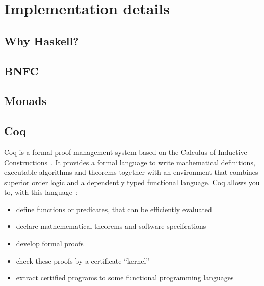 \chapter{Implementation details}

\section{Why Haskell?}

\section{BNFC}

\section{Monads}

\section{Coq} 
Coq is a formal proof management system based on the Calculus of Inductive
Constructions~\cite{coqart}. It provides a formal language to write mathematical
definitions, executable algorithms and theorems together with an environment
that combines superior order logic and a dependently typed functional language.
Coq allows you to, with this language~\cite{coqsite}:
\begin{itemize}
\item define functions or predicates, that can be efficiently evaluated
\item declare mathemematical theorems and software specifcations
\item develop formal proofs
\item check these proofs by a certificate ``kernel''
\item extract certified programs to some functional programming languages
\end{itemize}


